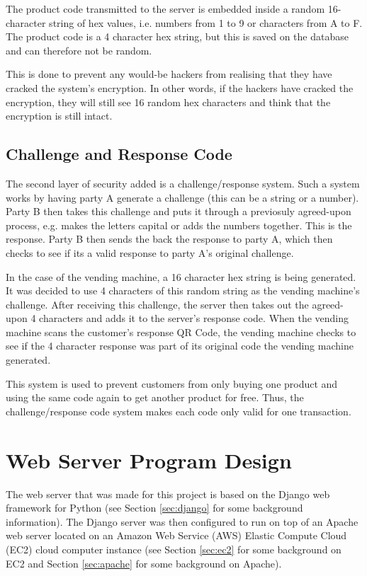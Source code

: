 The product code transmitted to the server is embedded inside a
random 16-character string of hex values, i.e. numbers from 1 to 9 or characters
from A to F. The product code is a 4 character hex string, but this is saved on
the database and can therefore not be random. 

This is done to prevent any would-be
hackers from realising that they have cracked the system's encryption. In other
words, if the hackers have cracked the encryption, they will still see 16
random hex characters and think that the encryption is still intact.

\subsection{Challenge and Response Code}

The second layer of security added is a challenge/response system. Such a system
works by having party A generate a challenge (this can be a string or a number).
Party B then takes this challenge and puts it through a previosuly agreed-upon
process, e.g. makes the letters capital or adds the numbers together. This
is the response. Party B then sends the back the response to party A, which then
checks to see if its a valid response to party A's original challenge.

In the case of the vending machine, a 16 character hex string is being
generated. It was decided to use 4 characters of this random string as the
vending machine's challenge. After receiving this challenge, the server then
takes out the agreed-upon 4 characters and adds it to the server's response
code. When the vending machine scans the customer's response QR Code, the
vending machine checks to see if the 4 character response was part of its
original code the vending machine generated.

This system is used to prevent customers from only buying one product and using
the same code again to get another product for free. Thus, the
challenge/response code system makes each code only valid for one transaction.

\section{Web Server Program Design}

The web server that was made for this project is based on the Django web framework for Python
(see Section \ref{sec:django} for some background information). The Django server was then
configured to run on top of an Apache web server located on an Amazon Web Service (AWS) Elastic
Compute Cloud (EC2) cloud computer instance (see Section \ref{sec:ec2} for some background
on EC2 and Section \ref{sec:apache} for some background on Apache).

